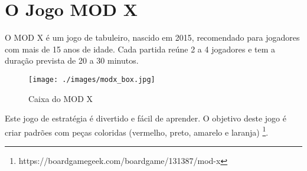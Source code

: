 \documentclass[a4paper]{article}
\begin{document}
%
%
%
%
%
%
%


\section{O Jogo MOD X}

O MOD X é um jogo de tabuleiro, nascido em 2015, recomendado para jogadores com mais de 15 anos de idade.
Cada partida reúne 2 a 4 jogadores e tem a duração prevista de 20 a 30 minutos.

\vspace{0.5cm}

\begin{figure}[h!]
	\begin{center}
		\texttt{[image: ./images/modx\_box.jpg]}
		\caption{Caixa do MOD X}
		\label{fig:1}
	\end{center}
\end{figure}

\vspace{0.5cm}

Este jogo de estratégia é divertido e fácil de aprender. 
O objetivo deste jogo é criar padrões com peças coloridas (vermelho, preto, amarelo e laranja) \footnote{https://boardgamegeek.com/boardgame/131387/mod-x}.
\end{document}
